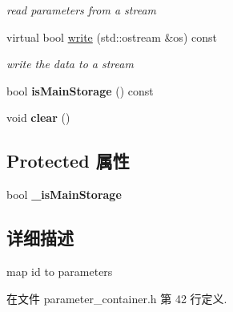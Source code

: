 \begin{DoxyCompactItemize}
\begin{DoxyCompactList}\small\item\em read parameters from a stream \end{DoxyCompactList}\item 
\hypertarget{classg2o_1_1ParameterContainer_addceeb97b3d737610e79142657c54851}{virtual bool \hyperlink{classg2o_1_1ParameterContainer_addceeb97b3d737610e79142657c54851}{write} (std\-::ostream \&os) const }\label{classg2o_1_1ParameterContainer_addceeb97b3d737610e79142657c54851}

\begin{DoxyCompactList}\small\item\em write the data to a stream \end{DoxyCompactList}\item 
\hypertarget{classg2o_1_1ParameterContainer_abfea723a17d417e6411bbd0c9fa50294}{bool {\bfseries is\-Main\-Storage} () const }\label{classg2o_1_1ParameterContainer_abfea723a17d417e6411bbd0c9fa50294}

\item 
\hypertarget{classg2o_1_1ParameterContainer_aff4d3792e2ebd022ebd4a1534b88b773}{void {\bfseries clear} ()}\label{classg2o_1_1ParameterContainer_aff4d3792e2ebd022ebd4a1534b88b773}

\end{DoxyCompactItemize}
\subsection*{Protected 属性}
\begin{DoxyCompactItemize}
\item 
\hypertarget{classg2o_1_1ParameterContainer_a2ff1e92bc6a486d48043e2191807bd47}{bool {\bfseries \-\_\-is\-Main\-Storage}}\label{classg2o_1_1ParameterContainer_a2ff1e92bc6a486d48043e2191807bd47}

\end{DoxyCompactItemize}


\subsection{详细描述}
map id to parameters 

在文件 parameter\-\_\-container.\-h 第 42 行定义.



